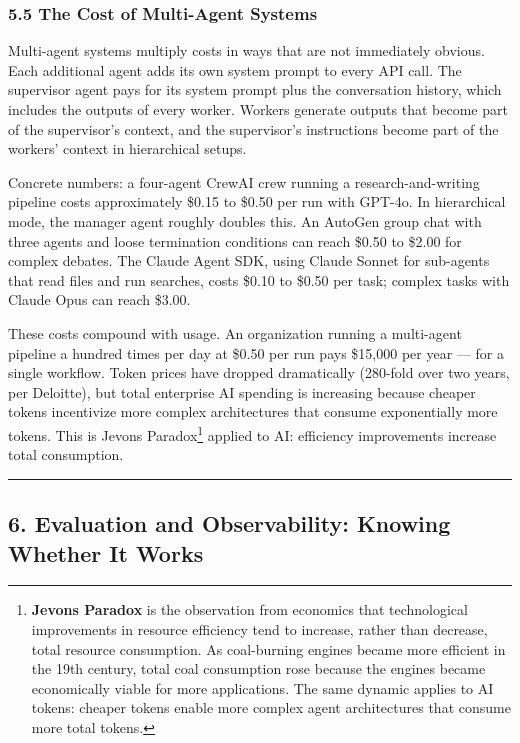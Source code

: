 \documentclass[11pt, a4paper]{article}
\begin{document}
\hypertarget{the-cost-of-multi-agent-systems}{%
\subsubsection{5.5 The Cost of Multi-Agent
Systems}\label{the-cost-of-multi-agent-systems}}

Multi-agent systems multiply costs in ways that are not immediately
obvious. Each additional agent adds its own system prompt to every API
call. The supervisor agent pays for its system prompt plus the
conversation history, which includes the outputs of every worker.
Workers generate outputs that become part of the supervisor's context,
and the supervisor's instructions become part of the workers' context in
hierarchical setups.

Concrete numbers: a four-agent CrewAI crew running a
research-and-writing pipeline costs approximately \$0.15 to \$0.50 per
run with GPT-4o. In hierarchical mode, the manager agent roughly doubles
this. An AutoGen group chat with three agents and loose termination
conditions can reach \$0.50 to \$2.00 for complex debates. The Claude
Agent SDK, using Claude Sonnet for sub-agents that read files and run
searches, costs \$0.10 to \$0.50 per task; complex tasks with Claude
Opus can reach \$3.00.

These costs compound with usage. An organization running a multi-agent
pipeline a hundred times per day at \$0.50 per run pays \$15,000 per
year --- for a single workflow. Token prices have dropped dramatically
(280-fold over two years, per Deloitte), but total enterprise AI
spending is increasing because cheaper tokens incentivize more complex
architectures that consume exponentially more tokens. This is Jevons
Paradox\footnote{\textbf{Jevons Paradox} is the observation from
  economics that technological improvements in resource efficiency tend
  to increase, rather than decrease, total resource consumption. As
  coal-burning engines became more efficient in the 19th century, total
  coal consumption rose because the engines became economically viable
  for more applications. The same dynamic applies to AI tokens: cheaper
  tokens enable more complex agent architectures that consume more total
  tokens.} applied to AI: efficiency improvements increase total
consumption.

\begin{center}\rule{0.5\linewidth}{0.5pt}\end{center}

\hypertarget{evaluation-and-observability-knowing-whether-it-works}{%
\subsection{6. Evaluation and Observability: Knowing Whether It
Works}\label{evaluation-and-observability-knowing-whether-it-works}}
\end{document}
